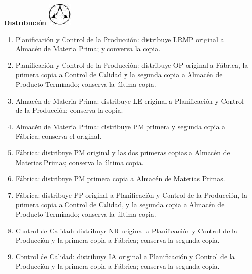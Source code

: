 \begin{center}
  \textbf{Distribución}
  \includegraphics{./Images/Simbolos/simbolo-Distribucion.png}
\end{center}
\begin{enumerate}
  \item Planificaci\'on y Control de la Producci\'on: distribuye LRMP original a Almac\'en de Materia Prima; y converva la copia.
  \item Planificaci\'on y Control de la Producci\'on: distribuye OP original a F\'abrica, la primera copia a Control de Calidad y la segunda copia a Almac\'en de Producto Terminado; conserva la \'ultima copia.
  \item Almac\'en de Materia Prima: distribuye LE original a Planificaci\'on y Control de la Producci\'on; conserva la copia.
  \item Almac\'en de Materia Prima: distribuye PM primera y segunda copia a F\'abrica; conserva el original. \item F\'abrica: distribuye PM original y las dos primeras copias a Almac\'en de Materias Primas; conserva la \'ultima copia.
  \item F\'abrica: distribuye PM primera copia a Almac\'en de Materias Primas. 	
  \item F\'abrica: distribuye PP original a Planificaci\'on y Control de la Producci\'on, la primera copia a Control de Calidad, y la segunda copia a Almac\'en de Producto Terminado; conserva la \'ultima copia.
  \item Control de Calidad: distribuye NR original a Planificaci\'on y Control de la Producci\'on y la primera copia a F\'abrica; conserva la segunda copia.
  \item Control de Calidad: distribuye IA original a Planificaci\'on y Control de la Producci\'on y la primera copia a F\'abrica; conserva la segunda copia.
\end{enumerate}

